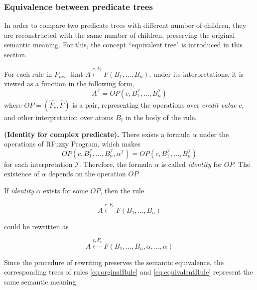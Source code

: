 \subsubsection{Equivalence between predicate trees}
\label{sec:EquivalentTree}
In order to compare two predicate trees with different number of children, they are reconstructed with the same number of children, preserving the original semantic meaning. For this, the concept ``equivalent tree" is introduced in this section.

For each rule in $P_{new}$ that $A \stackrel{c,F_c}{\longleftarrow}F(B_1,...,B_n)$, under its interpretations, it is viewed as a function in the following form,
\[A^{\mathcal{I}} = OP (c,B_1^{\mathcal{I}},...,B_n^{\mathcal{I}})\]
where $OP=(\hat{F_c},\hat{F})$ is a pair, representing the operations over \textit{credit value} $c$, and other interpretation over atoms $B_i$ in the body of the rule. 

\begin{defin}\textbf{(Identity for complex predicate).}
\label{def:IdentityComplex}
 There exists a formula $\alpha$ under the operations of RFuzzy Program, which makes
 \begin{equation}\label{eq:equivalentFormula}
 OP(c,B_1^{\mathcal{I}},...,B_n^{\mathcal{I}},\alpha^{\mathcal{I}})=OP(c,B_1^{\mathcal{I}},...,B_n^{\mathcal{I}})
 \end{equation}
for each interpretation $\mathcal{I}$. Therefore, the formula $\alpha$ is called \textit{identity} for $OP$. The existence of $\alpha$ depends on the operation $OP$.
\end{defin}

If \textit{identity} $\alpha$ exists for some $OP$, then the rule
\begin{center}
\begin{equation}\label{eq:orginalRule}
A \stackrel{c,F_c}{\longleftarrow}F(B_1,...,B_n)
\end{equation}
\end{center}
could be rewritten as
\begin{center}
\begin{equation}\label{eq:equivalentRule}
A \stackrel{c,F_c}{\longleftarrow}F(B_1,...,B_n,\alpha,...,\alpha)
\end{equation}
\end{center}

Since the procedure of rewriting preserves the semantic equivalence, the corresponding trees of rules \ref{eq:orginalRule} and \ref{eq:equivalentRule} represent the same semantic meaning.

